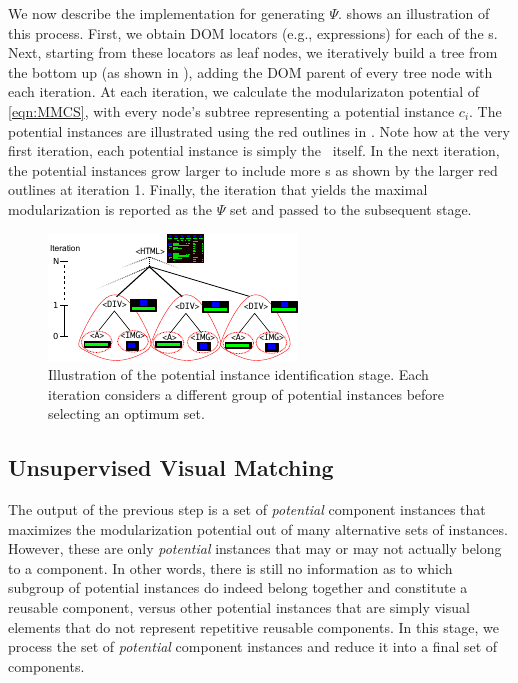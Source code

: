 We now describe the implementation for generating $\Psi$.  shows an illustration of this process.
First, we obtain DOM locators (e.g., {\xpath} expressions) for each of the {\VizElem}s. Next, starting from these locators as leaf nodes, we iteratively build a tree from the bottom up (as shown in ), adding the DOM parent of every tree node with each iteration.
At each iteration, we calculate the modularizaton potential of \cref{eqn:MMCS}, with every node's subtree representing a potential instance $c_i$. 
The potential instances are illustrated using the red outlines in . Note how at the very first iteration, each potential instance is simply the \VizElem~itself. In the next iteration, the potential instances grow larger to include more {\VizElem}s as shown by the larger red outlines at iteration 1.
Finally, the iteration that yields the maximal modularization is  reported as the $\Psi$ set and passed to the subsequent stage.

\begin{figure}
    \centering
    \includegraphics[width=0.9\linewidth]{maintainability/figures/potential-component-identification}
    \caption{Illustration of the potential instance identification stage. Each iteration considers a different group of potential instances before selecting an optimum set.}
    \label{fig:instance-potential-identification}
\end{figure} 

\subsection{Unsupervised Visual Matching}
The output of the previous step is a set of \emph{potential} component instances that maximizes the modularization potential out of many alternative sets of instances.
However, these are only \emph{potential} instances that may or may not actually belong to a component.
In other words, there is still no information as to which subgroup of potential instances do indeed belong together and constitute a reusable component,
versus other potential instances that are simply visual elements that do not represent repetitive reusable components.
In this stage, we process the set of \emph{potential} component instances and reduce it into a final set of components. 

